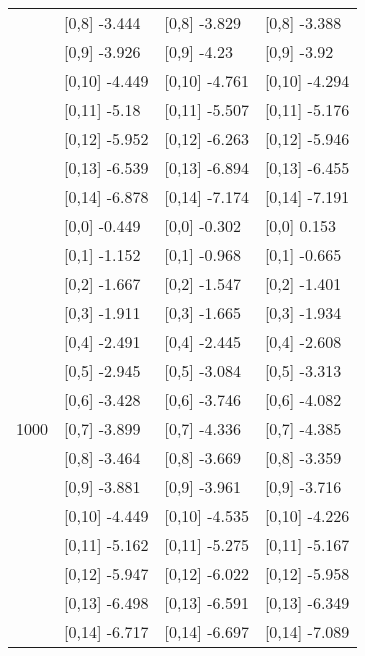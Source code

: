\begin{table}
\begin{tabular}[t]{llll}
 & {}[0,8] -3.444 & {}[0,8] -3.829 & {}[0,8] -3.388\\
 & {}[0,9] -3.926 & {}[0,9] -4.23 & {}[0,9] -3.92\\
\addlinespace
 & {}[0,10] -4.449 & {}[0,10] -4.761 & {}[0,10] -4.294\\
 & {}[0,11] -5.18 & {}[0,11] -5.507 & {}[0,11] -5.176\\
 & {}[0,12] -5.952 & {}[0,12] -6.263 & {}[0,12] -5.946\\
 & {}[0,13] -6.539 & {}[0,13] -6.894 & {}[0,13] -6.455\\
 & {}[0,14] -6.878 & {}[0,14] -7.174 & {}[0,14] -7.191\\
\addlinespace
 & {}[0,0] -0.449 & {}[0,0] -0.302 & {}[0,0] 0.153\\
 & {}[0,1] -1.152 & {}[0,1] -0.968 & {}[0,1] -0.665\\
 & {}[0,2] -1.667 & {}[0,2] -1.547 & {}[0,2] -1.401\\
 & {}[0,3] -1.911 & {}[0,3] -1.665 & {}[0,3] -1.934\\
 & {}[0,4] -2.491 & {}[0,4] -2.445 & {}[0,4] -2.608\\
\addlinespace
 & {}[0,5] -2.945 & {}[0,5] -3.084 & {}[0,5] -3.313\\
 & {}[0,6] -3.428 & {}[0,6] -3.746 & {}[0,6] -4.082\\
1000 & {}[0,7] -3.899 & {}[0,7] -4.336 & {}[0,7] -4.385\\
 & {}[0,8] -3.464 & {}[0,8] -3.669 & {}[0,8] -3.359\\
 & {}[0,9] -3.881 & {}[0,9] -3.961 & {}[0,9] -3.716\\
\addlinespace
 & {}[0,10] -4.449 & {}[0,10] -4.535 & {}[0,10] -4.226\\
 & {}[0,11] -5.162 & {}[0,11] -5.275 & {}[0,11] -5.167\\
 & {}[0,12] -5.947 & {}[0,12] -6.022 & {}[0,12] -5.958\\
 & {}[0,13] -6.498 & {}[0,13] -6.591 & {}[0,13] -6.349\\
 & {}[0,14] -6.717 & {}[0,14] -6.697 & {}[0,14] -7.089\\
\bottomrule
\end{tabular}
\end{table}
